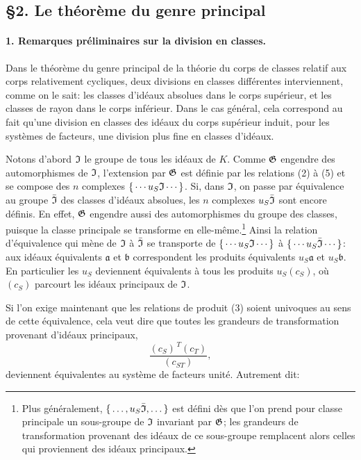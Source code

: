 \subsection*{\S{}2. Le théorème du genre principal}

\paragraph{1. Remarques préliminaires sur la division en classes.}
Dans le théorème du genre principal de la théorie du corps de classes relatif aux corps relativement cycliques, deux divisions en classes différentes interviennent, comme on le sait: les classes d'idéaux absolues dans le corps supérieur, et les classes de rayon dans le corps inférieur. Dans le cas général, cela correspond au fait qu'une division en classes des idéaux du corps supérieur induit, pour les systèmes de facteurs, une division plus fine en classes d'idéaux.

Notons d'abord \(\mathfrak I\) le groupe de tous les idéaux de \(K\). Comme \(\mathfrak G\) engendre des automorphismes de \(\mathfrak I\), l'extension par \(\mathfrak G\) est définie par les relations (2) à (5) et se compose des \(n\) complexes \(\{\,\cdots u_S\mathfrak I\cdots\,\}\). Si, dans \(\mathfrak I\), on passe par équivalence au groupe \(\bar{\mathfrak I}\) des classes d'idéaux absolues, les \(n\) complexes \(u_S\bar{\mathfrak I}\) sont encore définis. En effet, \(\mathfrak G\) engendre aussi des automorphismes du groupe des classes, puisque la classe principale se transforme en elle-même.\footnote{Plus généralement, \(\{\,\ldots,u_S\bar{\mathfrak I},\ldots\,\}\) est défini dès que l'on prend pour classe principale un sous-groupe de \(\mathfrak I\) invariant par \(\mathfrak G\); les grandeurs de transformation provenant des idéaux de ce sous-groupe remplacent alors celles qui proviennent des idéaux principaux.} Ainsi la relation d'équivalence qui mène de \(\mathfrak I\) à \(\bar{\mathfrak I}\) se transporte de \(\{\,\cdots u_S\mathfrak I\cdots\,\}\) à \(\{\,\cdots u_S\bar{\mathfrak I}\cdots\,\}\): aux idéaux équivalents \(\mathfrak a\) et \(\mathfrak b\) correspondent les produits équivalents \(u_S\mathfrak a\) et \(u_S\mathfrak b\). En particulier les \(u_S\) deviennent équivalents à tous les produits \(u_S(c_S)\), où \((c_S)\) parcourt les idéaux principaux de \(\mathfrak I\).

Si l'on exige maintenant que les relations de produit (3) soient univoques au sens de cette équivalence, cela veut dire que toutes les grandeurs de transformation provenant d'idéaux principaux,
\[
        \frac{(c_S)^{\,T}(c_T)}{(c_{ST})},
\]
deviennent équivalentes au système de facteurs unité. Autrement dit:

